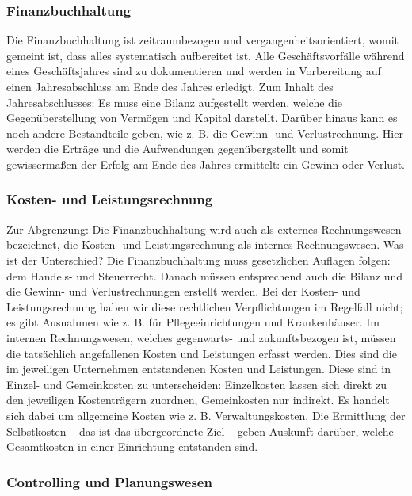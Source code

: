 \documentclass[
  letterpaper,
]{book}
\begin{document}
\subsubsection{Finanzbuchhaltung}\label{finanzbuchhaltung}

Die Finanzbuchhaltung ist zeitraumbezogen und vergangenheitsorientiert,
womit gemeint ist, dass alles systematisch aufbereitet ist. Alle
Geschäftsvorfälle während eines Geschäftsjahres sind zu dokumentieren
und werden in Vorbereitung auf einen Jahresabschluss am Ende des Jahres
erledigt. Zum Inhalt des Jahresabschlusses: Es muss eine Bilanz
aufgestellt werden, welche die Gegenüberstellung von Vermögen und
Kapital darstellt. Darüber hinaus kann es noch andere Bestandteile
geben, wie z. B. die Gewinn- und Verlustrechnung. Hier werden die
Erträge und die Aufwendungen gegenübergstellt und somit gewissermaßen
der Erfolg am Ende des Jahres ermittelt: ein Gewinn oder Verlust.

\subsubsection{Kosten- und
Leistungsrechnung}\label{kosten--und-leistungsrechnung}

Zur Abgrenzung: Die Finanzbuchhaltung wird auch als externes
Rechnungswesen bezeichnet, die Kosten- und Leistungsrechnung als
internes Rechnungswesen. Was ist der Unterschied? Die Finanzbuchhaltung
muss gesetzlichen Auflagen folgen: dem Handels- und Steuerrecht. Danach
müssen entsprechend auch die Bilanz und die Gewinn- und
Verlustrechnungen erstellt werden. Bei der Kosten- und Leistungsrechnung
haben wir diese rechtlichen Verpflichtungen im Regelfall nicht; es gibt
Ausnahmen wie z. B. für Pflegeeinrichtungen und Krankenhäuser. Im
internen Rechnungswesen, welches gegenwarts- und zukunftsbezogen ist,
müssen die tatsächlich angefallenen Kosten und Leistungen erfasst
werden. Dies sind die im jeweiligen Unternehmen entstandenen Kosten und
Leistungen. Diese sind in Einzel- und Gemeinkosten zu unterscheiden:
Einzelkosten lassen sich direkt zu den jeweiligen Kostenträgern
zuordnen, Gemeinkosten nur indirekt. Es handelt sich dabei um allgemeine
Kosten wie z. B. Verwaltungskosten. Die Ermittlung der Selbstkosten --
das ist das übergeordnete Ziel -- geben Auskunft darüber, welche
Gesamtkosten in einer Einrichtung entstanden sind.

\subsubsection{Controlling und
Planungswesen}\label{controlling-und-planungswesen}
\end{document}
